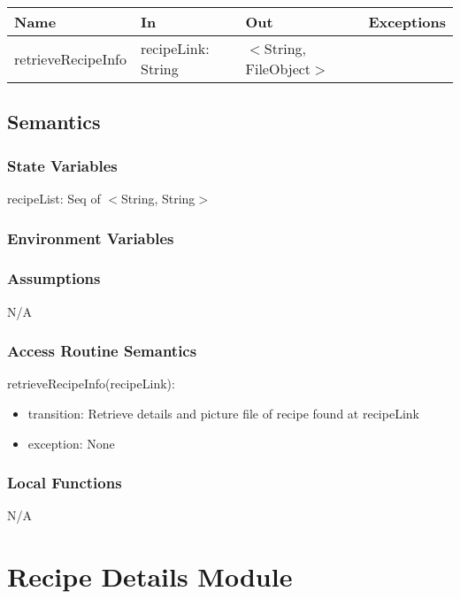 \documentclass[12pt, titlepage]{article}
\begin{document}
\begin{tabular}{| l | l | l | l |}
\hline
{\textbf{Name}} & {\textbf{In}} & {\textbf{Out}} & {\textbf{Exceptions}}\\
\hline
{retrieveRecipeInfo} &recipeLink: String & $<$String, FileObject$>$ & \\
\hline
\end{tabular}

\subsection{Semantics}

\subsubsection{State Variables}
recipeList: Seq of  $<$String, String$>$\\

\subsubsection{Environment Variables}

\subsubsection{Assumptions}

N/A

\subsubsection{Access Routine Semantics}

\noindent retrieveRecipeInfo(recipeLink):
\begin{itemize}
\item transition: Retrieve details and picture file of recipe found at recipeLink
\item exception: None
\end{itemize}

\subsubsection{Local Functions}

N/A

\section{Recipe Details Module} \label{Module} 
\end{document}
